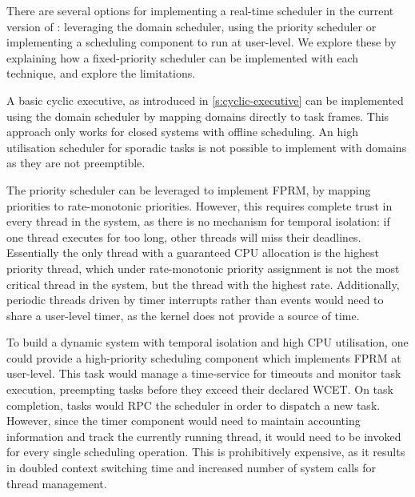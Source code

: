 There are several options for implementing a real-time scheduler in the current version of \selfour:
leveraging the domain scheduler, using the priority scheduler or implementing a scheduling component
to run at user-level. We explore these by explaining how a fixed-priority scheduler can be
implemented with each technique, and explore the limitations. 

A basic cyclic executive, as introduced in \cref{s:cyclic-executive} can be implemented using the
domain scheduler by mapping domains directly to task frames. This approach only works for closed
systems with offline scheduling. An high utilisation scheduler for sporadic tasks is not possible to implement
with domains as they are not preemptible. 

The priority scheduler can be leveraged to implement \gls{FPRM}, by mapping \selfour priorities to 
rate-monotonic priorities. 
However, this requires complete trust in every thread in the system, as there is no mechanism for
temporal isolation: if one thread executes for too long, other threads will miss their deadlines.
Essentially the only thread with a guaranteed CPU allocation is the highest priority thread, which
under rate-monotonic priority assignment is not the most critical thread in the system, but the
thread with the highest rate.  Additionally, periodic threads driven by timer interrupts rather than
events would need to share a user-level timer, as the kernel does not provide a source of time.

To build a dynamic system with temporal isolation and high CPU utilisation, one could provide a 
high-priority scheduling component which implements \gls{FPRM} at user-level. This task would manage a
time-service for timeouts and monitor task execution, preempting tasks before they exceed their
declared \gls{WCET}. On task completion, tasks would \gls{RPC} the scheduler in order to dispatch
a new task.
However, since the timer component would need to maintain accounting information and track the currently running thread, it would need to be invoked for every single scheduling operation.
This is prohibitively expensive, as it results in doubled context switching time and increased number of system calls for thread management.

